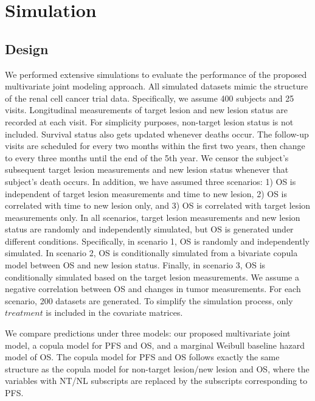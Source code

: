 \section{Simulation}
\label{sec:simulation}

\subsection{Design}
We performed extensive simulations to evaluate the performance of the proposed multivariate joint modeling approach. All simulated datasets mimic the structure of the renal cell cancer trial data. Specifically, we assume 400 subjects and 25 visits. Longitudinal measurements of target lesion and new lesion status are recorded at each visit. For simplicity purposes, non-target lesion status is not included. Survival status also gets updated whenever deaths occur. The follow-up visits are scheduled for every two months within the first two years, then change to every three months until the end of the 5th year. We censor the subject's subsequent target lesion measurements and new lesion status whenever that subject's death occurs. In addition, we have assumed three scenarios: 1) \ac{OS} is independent of target lesion measurements and time to new lesion, 2) \ac{OS} is correlated with time to new lesion only, and 3) \ac{OS} is correlated with target lesion measurements only. In all scenarios, target lesion measurements and new lesion status are randomly and independently simulated, but \ac{OS} is generated under different conditions. Specifically, in scenario 1, \ac{OS} is randomly and independently simulated. In scenario 2, \ac{OS} is conditionally simulated from a bivariate copula model between \ac{OS} and new lesion status. Finally, in scenario 3, \ac{OS} is conditionally simulated based on the target lesion measurements. We assume a negative correlation between \ac{OS} and changes in tumor measurements. For each scenario, 200 datasets are generated. To simplify the simulation process, only $treatment$ is included in the covariate matrices. 

We compare predictions under three models: our proposed multivariate joint model, a copula model for \ac{PFS} and \ac{OS}, and a marginal Weibull baseline hazard model of \ac{OS}. The copula model for \ac{PFS} and \ac{OS} follows exactly the same structure as the copula model for non-target lesion/new lesion and \ac{OS}, where the variables with NT/NL subscripts are replaced by the subscripts corresponding to \ac{PFS}. 

